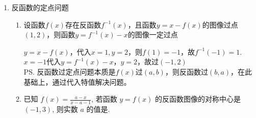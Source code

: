 \begin{enumerate}
\begin{enumerate}
\begin{jieda}
            因此两个倒域区间为$[1, \frac{1+\sqrt{5}}{2}]$和$[-\frac{1+\sqrt{5}}{2}, -1]$
        \end{jieda}
        \item 若函数$f(x)$在区间$[m, n]$上的值域恰是$[m, n]$，则称区间$[m, n]$是$f(x)$的一个等域区间. 若区间$[m,n]$是函数$y = \frac{(a+1)x - \frac{1}{a}}{ax}(a \neq 0)$的一个等域区间.求$n-m$的最大值.
        \begin{jieda}
            $\frac{(a+1)x - \frac{1}{a}}{ax} = \frac{a+1}{a} - \frac{1}{a^2x}$，故函数为$y = \frac{a+1}{a} - \frac{1}{a^2x} (a \neq 0)$，易知函数的定义域为$(-\infty, 0) \cup (0, +\infty)$，故必有$m < n < 0$或$0 < m < n$. 故易知函数在$[m, n]$内严格单调递增，故$\left \{ \begin{array}{l}
                    \frac{a+1}{a} - \frac{1}{a^2m} = m \\
                    \frac{a+1}{a} - \frac{1}{a^2n} = n
                \end{array} \right.$，即$m, n$是$a^2x^2 - (a+1)ax + 1 = 0$的两根. 由韦达定理有$\left \{ \begin{array}{l}
                    m+n = \frac{a+1}{a}\\
                    m \cdot n = \frac{1}{a^2}
                \end{array} \right.$，由$\Delta > 0$得$((a+1)^2 - 4)a^2 > 0$，故$a \in (-\infty, -3]\cup [1, +\infty)$ \\
                $n - m = \sqrt{(m+n)^2 - 4mn} = \sqrt{(\frac{a+1}{a})^2 - \frac{4}{a^2}} = \sqrt{\frac{a^2+2a-3}{a^2}} \leq \frac{2\sqrt{3}}{3}$，当$a = 3$时取等号.
        \end{jieda}
    \end{enumerate}
    \item 反函数的定点问题
    \begin{enumerate}
        \item 设函数$f(x)$存在反函数$f^{-1}(x)$，且函数$y = x - f(x)$的图像过点$(1, 2)$，则函数$y = f^{-1}(x) - x$的图像一定过点
        \begin{jieda}
            $y = x - f(x)$，代入$x = 1, y = 2$，则$f(1) = -1$，故$f^{-1}(-1) = 1$. $x = -1$代入$y = f^{-1}(x) - x$，$y = 2$，故过$(-1, 2)$ \\
            \ps 反函数过定点问题本质是$f(x)$过$(a, b)$，则反函数过$(b, a)$，在此基础上，通过代入特值解决问题。
        \end{jieda}
        \item 已知 $f(x)=\frac{a-x}{x-a-1}$, 若函数 $y=f(x)$ 的反函数图像的对称中心是 $(-1,3)$, 则实数 $a$ 的值是.

\end{enumerate}
\end{enumerate}
